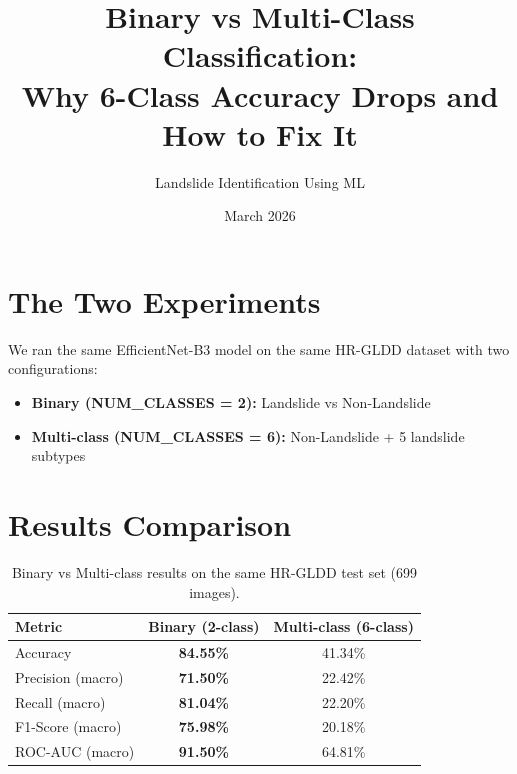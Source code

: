 \documentclass[12pt,a4paper]{article}
\title{Binary vs Multi-Class Classification:\\Why 6-Class Accuracy Drops and How to Fix It}
\author{Landslide Identification Using ML}
\date{March 2026}
\begin{document}
\maketitle

\section{The Two Experiments}

We ran the same EfficientNet-B3 model on the same HR-GLDD dataset with two configurations:

\begin{itemize}
    \item \textbf{Binary (NUM\_CLASSES = 2):} Landslide vs Non-Landslide
    \item \textbf{Multi-class (NUM\_CLASSES = 6):} Non-Landslide + 5 landslide subtypes
\end{itemize}

\section{Results Comparison}

\begin{table}[h]
    \centering
    \renewcommand{\arraystretch}{1.3}
    \begin{tabular}{lcc}
        \toprule
        \textbf{Metric} & \textbf{Binary (2-class)} & \textbf{Multi-class (6-class)} \\
        \midrule
        Accuracy        & \textcolor{goodgreen}{\textbf{84.55\%}} & \textcolor{badred}{41.34\%} \\
        Precision (macro) & \textcolor{goodgreen}{\textbf{71.50\%}} & \textcolor{badred}{22.42\%} \\
        Recall (macro)    & \textcolor{goodgreen}{\textbf{81.04\%}} & \textcolor{badred}{22.20\%} \\
        F1-Score (macro)  & \textcolor{goodgreen}{\textbf{75.98\%}} & \textcolor{badred}{20.18\%} \\
        ROC-AUC (macro)   & \textcolor{goodgreen}{\textbf{91.50\%}} & \textcolor{badred}{64.81\%} \\
        \bottomrule
    \end{tabular}
    \caption{Binary vs Multi-class results on the same HR-GLDD test set (699 images).}
\end{table}
\end{document}
